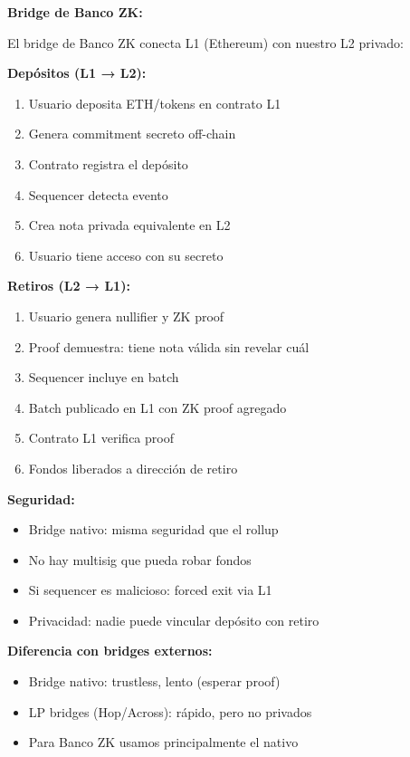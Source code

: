 \documentclass[11pt,a4paper,twoside,openright]{book}
\theoremstyle{definition}
\theoremstyle{plain}
\theoremstyle{remark}
\begin{document}
\begin{bancozk}
\textbf{Bridge de Banco ZK:}

El bridge de Banco ZK conecta L1 (Ethereum) con nuestro L2 privado:

\textbf{Depósitos (L1 → L2):}
\begin{enumerate}
    \item Usuario deposita ETH/tokens en contrato L1
    \item Genera commitment secreto off-chain
    \item Contrato registra el depósito
    \item Sequencer detecta evento
    \item Crea nota privada equivalente en L2
    \item Usuario tiene acceso con su secreto
\end{enumerate}

\textbf{Retiros (L2 → L1):}
\begin{enumerate}
    \item Usuario genera nullifier y ZK proof
    \item Proof demuestra: tiene nota válida sin revelar cuál
    \item Sequencer incluye en batch
    \item Batch publicado en L1 con ZK proof agregado
    \item Contrato L1 verifica proof
    \item Fondos liberados a dirección de retiro
\end{enumerate}

\textbf{Seguridad:}
\begin{itemize}
    \item Bridge nativo: misma seguridad que el rollup
    \item No hay multisig que pueda robar fondos
    \item Si sequencer es malicioso: forced exit via L1
    \item Privacidad: nadie puede vincular depósito con retiro
\end{itemize}

\textbf{Diferencia con bridges externos:}
\begin{itemize}
    \item Bridge nativo: trustless, lento (esperar proof)
    \item LP bridges (Hop/Across): rápido, pero no privados
    \item Para Banco ZK usamos principalmente el nativo
\end{itemize}
\end{bancozk}
\end{document}
